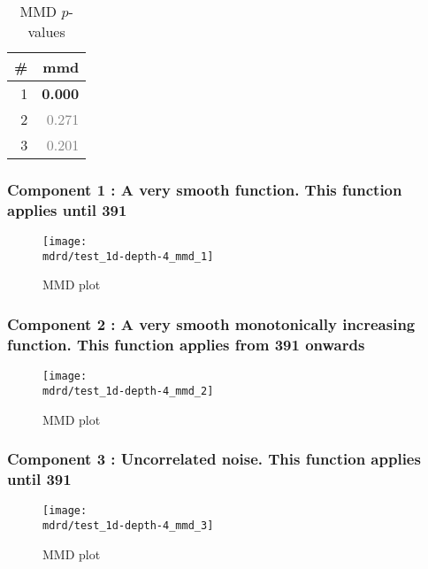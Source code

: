 \documentclass{article} %
\begin{document}
\begin{table}[htb]
\begin{center}
{\small
\begin{tabular}{|r|r|}
\hline
\bf{\#} & {mmd}\\
\hline

1 & \textbf{0.000}\\

2 & \textcolor{gray}{0.271}\\

3 & \textcolor{gray}{0.201}\\

\hline
\end{tabular}
\caption{
MMD $p$-values
}
\label{table:mmd}
}
\end{center}
\end{table}

\subsubsection{Component 1 : A very smooth function. This function applies until  391}

\begin{figure}[H]
\newcommand{\wmgd}{0.5\columnwidth}
\newcommand{\hmgd}{3.0cm}
\newcommand{\mdrd}{test_1d-depth-4}
\newcommand{\mbm}{\hspace{-0.3cm}}
\texttt{[image: \\mdrd/test\_1d-depth-4\_mmd\_1]}
\caption{
MMD plot}
\label{fig:mmd1}
\end{figure}

\subsubsection{Component 2 : A very smooth monotonically increasing function. This function applies from  391 onwards}

\begin{figure}[H]
\newcommand{\wmgd}{0.5\columnwidth}
\newcommand{\hmgd}{3.0cm}
\newcommand{\mdrd}{test_1d-depth-4}
\newcommand{\mbm}{\hspace{-0.3cm}}
\texttt{[image: \\mdrd/test\_1d-depth-4\_mmd\_2]}
\caption{
MMD plot}
\label{fig:mmd2}
\end{figure}

\subsubsection{Component 3 : Uncorrelated noise. This function applies until  391}

\begin{figure}[H]
\newcommand{\wmgd}{0.5\columnwidth}
\newcommand{\hmgd}{3.0cm}
\newcommand{\mdrd}{test_1d-depth-4}
\newcommand{\mbm}{\hspace{-0.3cm}}
\texttt{[image: \\mdrd/test\_1d-depth-4\_mmd\_3]}
\caption{
MMD plot}
\label{fig:mmd3}
\end{figure}
\end{document}
